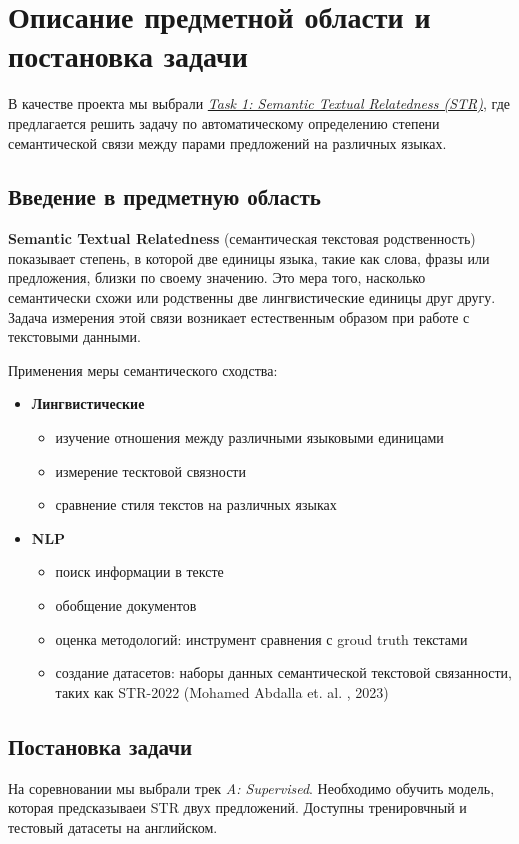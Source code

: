 \documentclass[12pt]{article}
\begin{document}
\tableofcontents
\newpage

\section{Описание предметной области и постановка задачи}
В качестве проекта мы выбрали \href{https://semantic-textual-relatedness.github.io/}{\textit{Task 1: Semantic Textual Relatedness (STR)}}, где предлагается решить задачу по автоматическому определению степени семантической связи между парами предложений на различных языках.

\subsection{Введение в предметную область}
\textbf{Semantic Textual Relatedness} (семантическая текстовая родственность) показывает степень, в которой две единицы языка, такие как слова, фразы или предложения, близки по своему значению. Это мера того, насколько семантически схожи или родственны две лингвистические единицы друг другу. Задача измерения этой связи возникает естественным образом при работе с текстовыми данными.

Применения меры семантического сходства:
\begin{itemize}
    \item \textbf{Лингвистические}
    \begin{itemize}
        \item изучение отношения между различными языковыми единицами
        \item измерение тесктовой связности
        \item сравнение стиля текстов на различных языках
    \end{itemize}

    \item \textbf{NLP}
    \begin{itemize}
        \item поиск информации в тексте
        \item обобщение документов
        \item оценка методологий: инструмент сравнения с groud truth текстами
        \item создание датасетов: наборы данных семантической текстовой связанности, таких как STR-2022 (Mohamed Abdalla et. al. , 2023)
    \end{itemize}
\end{itemize}

\subsection{Постановка задачи}
На соревновании мы выбрали трек \textit{A: Supervised}. Необходимо обучить модель, которая предсказываеи STR двух предложений. Доступны тренировчный и тестовый датасеты на английском.
\end{document}
